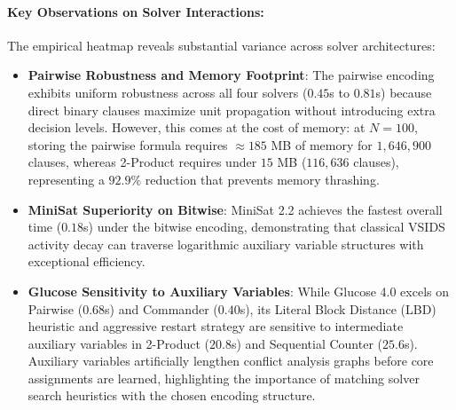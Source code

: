 \documentclass[a4paper,fleqn]{cas-sc}
\begin{document}
\paragraph{Key Observations on Solver Interactions:}
The empirical heatmap reveals substantial variance across solver architectures:
\begin{itemize}
    \item \textbf{Pairwise Robustness and Memory Footprint}: The pairwise encoding exhibits uniform robustness across all four solvers ($0.45$s to $0.81$s) because direct binary clauses maximize unit propagation without introducing extra decision levels. However, this comes at the cost of memory: at $N=100$, storing the pairwise formula requires $\approx 185$ MB of memory for $1,646,900$ clauses, whereas 2-Product requires under $15$ MB ($116,636$ clauses), representing a $92.9\%$ reduction that prevents memory thrashing.
    \item \textbf{MiniSat Superiority on Bitwise}: MiniSat 2.2 achieves the fastest overall time ($0.18$s) under the bitwise encoding, demonstrating that classical VSIDS activity decay can traverse logarithmic auxiliary variable structures with exceptional efficiency.
    \item \textbf{Glucose Sensitivity to Auxiliary Variables}: While Glucose 4.0 excels on Pairwise ($0.68$s) and Commander ($0.40$s), its Literal Block Distance (LBD) heuristic and aggressive restart strategy are sensitive to intermediate auxiliary variables in 2-Product ($20.8$s) and Sequential Counter ($25.6$s). Auxiliary variables artificially lengthen conflict analysis graphs before core assignments are learned, highlighting the importance of matching solver search heuristics with the chosen encoding structure.
\end{itemize}
\end{document}

